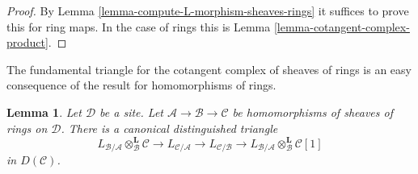 \documentclass{stacks-project}
\theoremstyle{plain}
\newtheorem{lemma}[subsection]{Lemma}
\theoremstyle{definition}
\theoremstyle{remark}
\numberwithin{equation}{subsection}
\begin{document}
\begin{proof}
By Lemma \ref{lemma-compute-L-morphism-sheaves-rings}
it suffices to prove this for ring maps.
In the case of rings this is
Lemma \ref{lemma-cotangent-complex-product}.
\end{proof}

\noindent
The fundamental triangle for the cotangent complex of sheaves of rings
is an easy consequence of the result for homomorphisms of rings.

\begin{lemma}
\label{lemma-triangle-sheaves-rings}
Let $\mathcal{D}$ be a site. Let $\mathcal{A} \to \mathcal{B} \to \mathcal{C}$
be homomorphisms of sheaves of rings on $\mathcal{D}$.
There is a canonical distinguished triangle
$$
L_{\mathcal{B}/\mathcal{A}} \otimes_\mathcal{B}^\mathbf{L} \mathcal{C}
\to L_{\mathcal{C}/\mathcal{A}} \to L_{\mathcal{C}/\mathcal{B}} \to
L_{\mathcal{B}/\mathcal{A}} \otimes_\mathcal{B}^\mathbf{L} \mathcal{C}[1]
$$
in $D(\mathcal{C})$.
\end{lemma}
\end{document}

